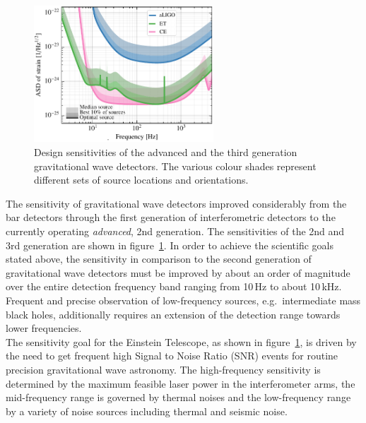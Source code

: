 \begin{figure}
\vskip -0.4cm
	\centering
	\includegraphics[width=0.6\textwidth]{Intro/Intro_Figures/noises_percentiles-Voyager(1).pdf}
	\caption{Design sensitivities of the advanced and the third generation gravitational wave detectors. The various colour shades represent different sets of source locations and orientations.}
	\label{fig:GW_sens_evolution}
\end{figure}
The sensitivity of gravitational wave detectors improved considerably from the bar detectors through the first generation of interferometric detectors to the currently operating \textit{advanced}, 2nd generation. The sensitivities of the 2nd and 3rd generation are shown in figure~\ref{fig:GW_sens_evolution}. 
In order to achieve the scientific goals stated above, the sensitivity in comparison to the second generation of gravitational wave detectors must be improved by about an order of magnitude over the entire detection frequency band ranging from 10\,Hz to about 10\,kHz. Frequent and precise observation of low-frequency sources, e.g.\ intermediate mass black holes, additionally requires an extension of the detection range towards lower frequencies. \\
The sensitivity goal for the Einstein Telescope, as shown in figure~\ref{fig:GW_sens_evolution}, is driven by the need to get frequent high Signal to Noise Ratio (SNR) events for routine precision gravitational wave astronomy. The high-frequency sensitivity is determined by the maximum feasible laser power in the interferometer arms, the mid-frequency range is governed by thermal noises and the low-frequency range by a variety of noise sources including thermal and seismic noise.\\
